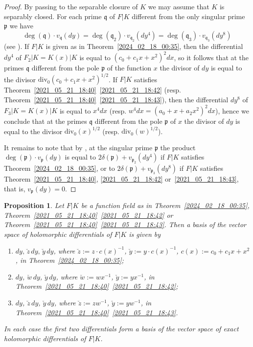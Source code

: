 \documentclass[12pt,reqno]{amsart}
\newtheorem{prop}[thm]{Proposition}
\theoremstyle{definition}
\newcommand{\pp}{\mathfrak{p}}
\newcommand{\fq}{\mathfrak{q}}
\newcommand{\de}{\delta}
\begin{document}
\begin{proof}
By passing to the separable closure of $K$ we may assume that $K$ is separably closed.
For each prime $\fq $ of $F|K$ different from the only singular prime $\pp$ we have 
\[ \deg(\fq) \cdot v_\fq(dy) = \deg(\fq_2) \cdot v_{\fq_2} (dy^4) = \deg(\fq_3) \cdot v_{\fq_3} (dy^8) \] 
(see \cite[Theorem~2.7]{BedSt87}).
If $F|K$ is given as in Theorem~\ref{2024_02_18_00:35}, then
the differential $dy^4$ of $F_2|K=K(x)|K$ is equal to $(c_0 + c_1 x + x^2)^2 dx$, so it follows that at the primes $\fq$ different from the pole $\pp$ of the function $x$ the divisor of $dy$ is equal to the divisor $\mathrm{div}_0 ( c_0 + c_1 x + x^2 )^{1/2}$.
If $F|K$ satisfies Theorem~\ref{2021_05_21_18:40}~\ref{2021_05_21_18:42}
(resp. Theorem~\ref{2021_05_21_18:40}~\ref{2021_05_21_18:43}),
then the differential $dy^8$ of $F_3|K = K(x)|K$ is equal to $x^4 dx$ (resp. $w^4 dx = (a_0 + x + a_2 x^2)^2 dx$), hence we conclude that at the primes $\fq$ different from the pole $\pp$ of $x$ the divisor of $dy$ is equal to the divisor $\mathrm{div}_0(x)^{1/2}$ (resp. $\mathrm{div}_0(w)^{1/2}$).

It remains to note that by \cite[Theorem~2.7]{BedSt87},
at the singular prime $\pp$ the product $\deg(\pp) \cdot v_\pp(dy)$ is equal to $2 \de(\pp) + v_{\pp_2}(dy^4)$ if $F|K$ satisfies Theorem~\ref{2024_02_18_00:35}, or to $2 \de(\pp) + v_{\pp_3}(dy^8)$ if $F|K$ satisfies Theorem~\ref{2021_05_21_18:40}, \ref{2021_05_21_18:42} or~\ref{2021_05_21_18:43}, that is, $v_\pp(dy)=0$.
\end{proof}



\begin{prop}\label{2024_08_04_19:35}
Let $F|K$ be a function field as in Theorem~\ref{2024_02_18_00:35}, Theorem~\ref{2021_05_21_18:40}~\ref{2021_05_21_18:42} or Theorem~\ref{2021_05_21_18:40}~\ref{2021_05_21_18:43}.
Then a basis of the vector space of holomorphic differentials of $F|K$ is given by
\begin{enumerate}[\upshape (a)]
    \item $dy, \, \breve z \, dy, \, \breve y \, dy$, where $\breve z:= z \cdot c(x)^{-1}$, $\breve y := y \cdot c(x)^{-1}$, $c(x) := c_0 + c_1 x + x^2$, in Theorem~\ref{2024_02_18_00:35};
    \item $dy$, $\breve w \, dy$, $\breve y \, dy$, where $\breve w := wx^{-1}$, $\breve y := y x^{-1}$, in Theorem~\ref{2021_05_21_18:40}~\ref{2021_05_21_18:42};
    \item $dy$, $\breve z \, dy$, $\breve y \, dy$, where $\breve z := zw^{-1}$, $\breve y := yw^{-1}$, in Theorem~\ref{2021_05_21_18:40}~\ref{2021_05_21_18:43}.
\end{enumerate}
In each case the first two differentials form a basis of the vector space of exact holomorphic differentials of $F|K$.
\end{prop}
\end{document}
